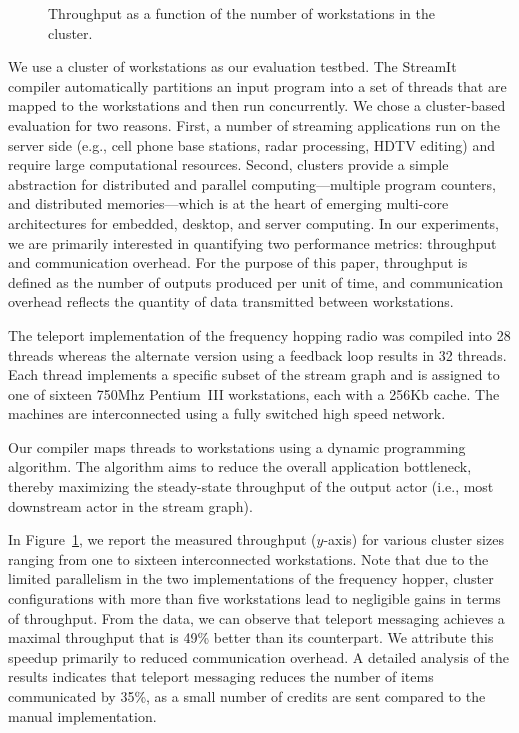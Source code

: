 \begin{figure}[t]
\vspace{-16pt}
\vspace{-20pt}
\caption{\small Throughput as a function of the number of workstations
in the cluster. 
\protect\label{fig:fhr-throughput}}
\vspace{-6pt}
\end{figure}

We use a cluster of workstations as our evaluation testbed.  The
StreamIt compiler automatically partitions an input program into a set
of threads that are mapped to the workstations and then run
concurrently.  We chose a cluster-based evaluation for two reasons.
First, a number of streaming applications run on the server side
(e.g., cell phone base stations, radar processing, HDTV editing) and
require large computational resources. Second, clusters provide a
simple abstraction for distributed and parallel computing---multiple
program counters, and distributed memories---which is at the heart of
emerging multi-core architectures for embedded, desktop, and server
computing.  In our experiments, we are primarily interested in
quantifying two performance metrics: throughput and communication
overhead.  For the purpose of this paper, throughput is defined as the
number of outputs produced per unit of time, and communication
overhead reflects the quantity of data transmitted between
workstations.

The teleport implementation of the frequency hopping radio was
compiled into 28 threads whereas the alternate version using a
feedback loop results in 32 threads.  Each thread implements a
specific subset of the stream graph and is assigned to one of sixteen
750Mhz Pentium~III workstations, each with a 256Kb cache.  The
machines are interconnected using a fully switched high speed network.

Our compiler maps threads to workstations using a dynamic programming
algorithm.  The algorithm aims to reduce the overall application
bottleneck, thereby maximizing the steady-state throughput of the
output actor (i.e., most downstream actor in the stream graph).

In Figure~\ref{fig:fhr-throughput}, we report the measured throughput
($y$-axis) for various cluster sizes ranging from one to sixteen
interconnected workstations. Note that due to the limited parallelism
in the two implementations of the frequency hopper, cluster
configurations with more than five workstations lead to negligible
gains in terms of throughput. From the data, we can observe that
teleport messaging achieves a maximal throughput that is 49\% better
than its counterpart.  We attribute this speedup primarily to reduced
communication overhead.  A detailed analysis of the results indicates
that teleport messaging reduces the number of items communicated by
35\%, as a small number of credits are sent compared to the manual
implementation.

